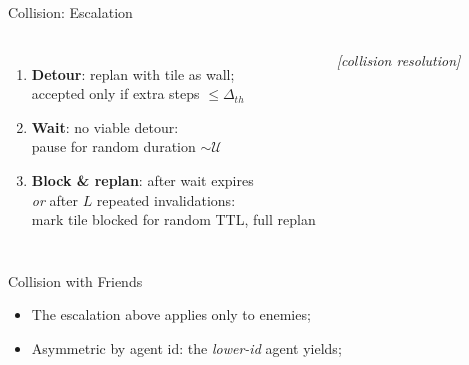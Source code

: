 \begin{frame}{Collision: Escalation}
  \begin{columns}
      \begin{enumerate}
        \item \textbf{Detour}: replan with tile as wall;\\
              accepted only if extra steps $\leq \Delta_{th}$
        \item \textbf{Wait}: no viable detour:\\
              pause for random duration $\sim \mathcal{U}$
        \item \textbf{Block \& replan}: after wait expires\\
              \emph{or} after $L$ repeated invalidations:\\
              mark tile blocked for random TTL, full replan
      \end{enumerate}
      \begin{block}{}
        \centering\textit{[collision resolution]}
      \end{block}
  \end{columns}
\end{frame}

\begin{frame}{Collision with Friends}
    \begin{itemize}
        \item The escalation above applies only to enemies; 
        \item Asymmetric by agent id: the \emph{lower-id} agent yields;
    \end{itemize}
\end{frame}
